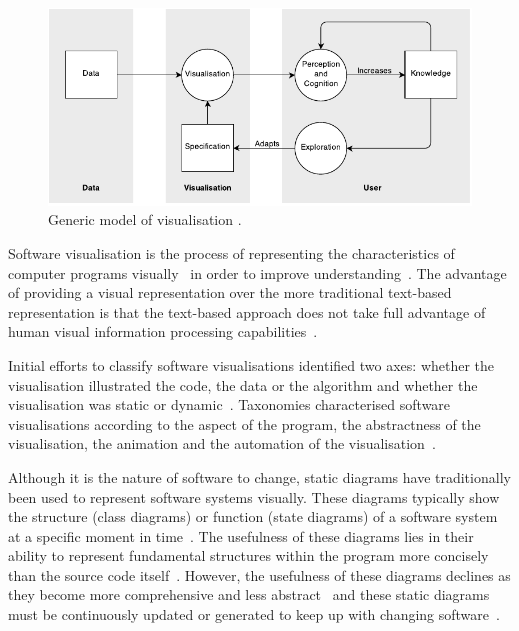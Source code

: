 \begin{figure}
  \centering \includegraphics[width=\columnwidth]{../images/diagrams/wijk-model-of-visualisation.pdf}
  \caption{Generic model of visualisation \protect\cite{VanWijk2005}.}
\label{fig:model-of-visualisation}
\end{figure}


Software visualisation is the process of representing the characteristics of computer programs visually~\cite{Stasko1992} in order to improve understanding~\cite{Diehl2007}. The advantage of providing a visual representation over the more traditional text-based representation is that the text-based approach does not take full advantage of human visual information processing capabilities~\cite{Myers1989}.

Initial efforts to classify software visualisations identified two axes: whether the visualisation illustrated the code, the data or the algorithm and whether the visualisation was static or dynamic~\cite{Myers1989}. Taxonomies characterised software visualisations according to the aspect of the program, the abstractness of the visualisation, the animation and the automation of the visualisation~\cite{Stasko1992}.

Although it is the nature of software to change, static diagrams have traditionally been used to represent software systems visually. These diagrams typically show the structure (class diagrams) or function (state diagrams) of a software system at a specific moment in time~\cite{Rumbaugh2004}. The usefulness of these diagrams lies in their ability to represent fundamental structures within the program more concisely than the source code itself~. However, the usefulness of these diagrams declines as they become more comprehensive and less abstract~ and these static diagrams must be continuously updated or generated to keep up with changing software~.

